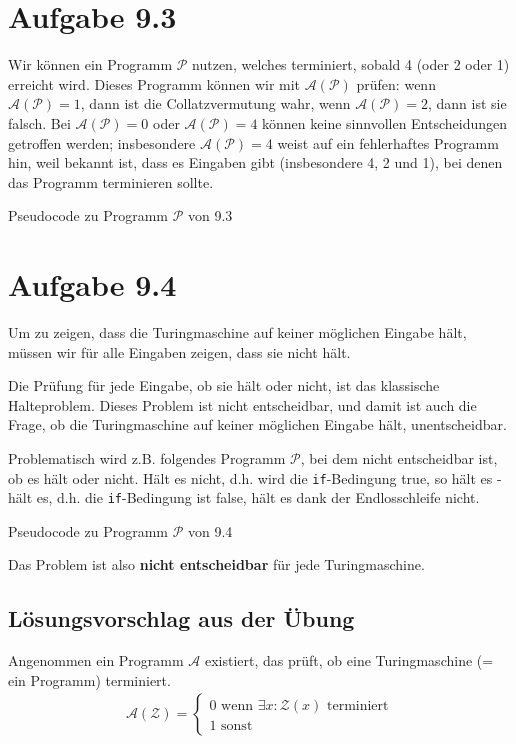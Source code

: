 \documentclass{article}
\begin{document}
\section*{Aufgabe 9.3}
Wir können ein Programm $\mathcal{P}$ nutzen, welches terminiert, sobald 4 (oder 2 oder 1) erreicht wird. Dieses Programm können wir mit $\mathcal{A}(\mathcal{P})$ prüfen: wenn $\mathcal{A}(\mathcal{P}) = 1$, dann ist die Collatzvermutung wahr, wenn $\mathcal{A}(\mathcal{P}) = 2$, dann ist sie falsch. Bei $\mathcal{A}(\mathcal{P}) = 0$ oder $\mathcal{A}(\mathcal{P}) = 4$ können keine sinnvollen Entscheidungen getroffen werden; insbesondere $\mathcal{A}(\mathcal{P}) = 4$ weist auf ein fehlerhaftes Programm hin, weil bekannt ist, dass es Eingaben gibt (insbesondere 4, 2 und 1), bei denen das Programm terminieren sollte.
\begin{algorithm}[ht]
  \caption{Pseudocode zu Programm $\mathcal{P}$ von 9.3}
\end{algorithm}



\section*{Aufgabe 9.4}
Um zu zeigen, dass die Turingmaschine auf keiner möglichen Eingabe hält, müssen wir für alle Eingaben zeigen, dass sie nicht hält.

Die Prüfung für jede Eingabe, ob sie hält oder nicht, ist das klassische Halteproblem. Dieses Problem ist nicht entscheidbar, und damit ist auch die Frage, ob die Turingmaschine auf keiner möglichen Eingabe hält, unentscheidbar.

\bigskip

Problematisch wird z.B. folgendes Programm $\mathcal{P}$, bei dem nicht entscheidbar ist, ob es hält oder nicht. Hält es nicht, d.h. wird die \texttt{if}-Bedingung true, so hält es - hält es, d.h. die \texttt{if}-Bedingung ist false, hält es dank der Endlosschleife nicht.
\begin{algorithm}[ht]
  \caption{Pseudocode zu Programm $\mathcal{P}$ von 9.4}
\end{algorithm}
Das Problem ist also \textbf{nicht entscheidbar} für jede Turingmaschine.

\subsection*{Lösungsvorschlag aus der Übung}
Angenommen ein Programm $\mathcal{A}$ existiert, das prüft, ob eine Turingmaschine (= ein Programm) terminiert.
\begin{align*}
\mathcal{A}(\mathcal{Z}) = \begin{cases}
0 \text{ wenn $\exists x:\mathcal{Z}(x)$ terminiert} \\
1 \text{ sonst}
\end{cases}
\end{align*}
\end{document}
